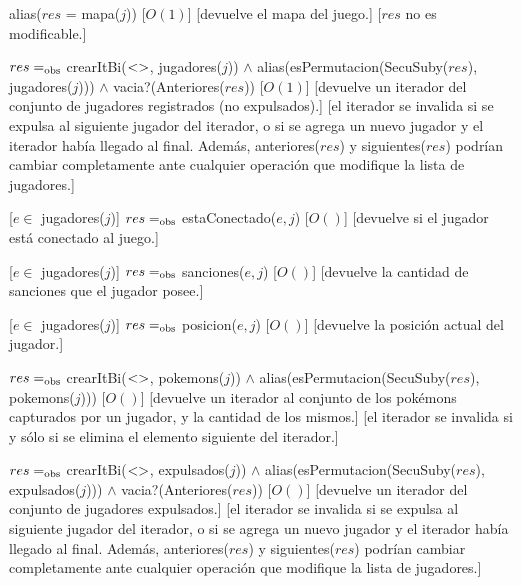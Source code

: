 \begin{Interfaz}
	{alias($res$ = mapa($j$))}
	[$O(1)$]
	[devuelve el mapa del juego.]
	[$res$ no es modificable.]

	{$res =_{\mathrm{obs}}$ crearItBi($<>$, jugadores($j$)) $\land$ alias(esPermutacion(SecuSuby($res$), jugadores($j$))) $\land$ vacia?(Anteriores($res$))}
	[$O(1)$]
	[devuelve un iterador del conjunto de jugadores registrados (no expulsados).]
	[el iterador se invalida si se expulsa al siguiente jugador del iterador, o si se agrega un nuevo jugador y el iterador había llegado al final. Además, anteriores($res$) y siguientes($res$) podrían cambiar completamente ante cualquier operación que modifique la lista de jugadores.]

	[$e \in$ jugadores($j$)]
	{$res =_{\mathrm{obs}}$ estaConectado($e, j$)}
	[$O()$]
	[devuelve si el jugador está conectado al juego.]

	[$e \in$ jugadores($j$)]
	{$res =_{\mathrm{obs}}$ sanciones($e, j$)}
	[$O()$]
	[devuelve la cantidad de sanciones que el jugador posee.]

	[$e \in$ jugadores($j$)]
	{$res =_{\mathrm{obs}}$ posicion($e, j$)}
	[$O()$]
	[devuelve la posición actual del jugador.]

	{$res =_{\mathrm{obs}}$ crearItBi($<>$, pokemons($j$)) $\land$ alias(esPermutacion(SecuSuby($res$), pokemons($j$)))}
	[$O()$]
	[devuelve un iterador al conjunto de los pokémons capturados por un jugador, y la cantidad de los mismos.]
	[el iterador se invalida si y sólo si se elimina el elemento siguiente del iterador.]

	{$res =_{\mathrm{obs}}$ crearItBi($<>$, expulsados($j$)) $\land$ alias(esPermutacion(SecuSuby($res$), expulsados($j$))) $\land$ vacia?(Anteriores($res$))}
	[$O()$]
	[devuelve un iterador del conjunto de jugadores expulsados.]
	[el iterador se invalida si se expulsa al siguiente jugador del iterador, o si se agrega un nuevo jugador y el iterador había llegado al final. Además, anteriores($res$) y siguientes($res$) podrían cambiar completamente ante cualquier operación que modifique la lista de jugadores.]


\end{Interfaz}
